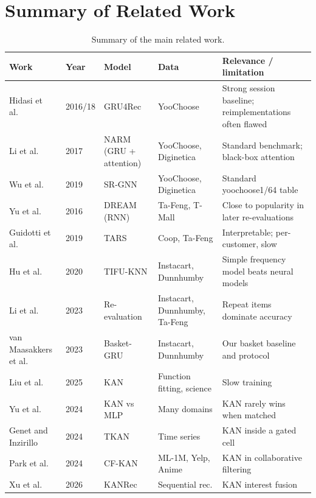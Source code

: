 \documentclass[12pt,a4paper]{report}
\begin{document}
\section{Summary of Related Work}


\begin{table}[H]
\centering
\caption{Summary of the main related work.}
\label{tab:related}
\small
\begin{tabular}{L{3.2cm} L{1.3cm} L{2.7cm} L{2.5cm} L{3.9cm}}
\toprule
\textbf{Work} & \textbf{Year} & \textbf{Model} & \textbf{Data} & \textbf{Relevance / limitation} \\
\midrule
Hidasi et al.\ \cite{hidasi2016,hidasi2018} & 2016/18 & GRU4Rec & YooChoose & Strong session baseline; reimplementations often flawed \cite{hidasi2023} \\
Li et al.\ \cite{li2017} & 2017 & NARM (GRU + attention) & YooChoose, Diginetica & Standard benchmark; black-box attention \\
Wu et al.\ \cite{wu2019} & 2019 & SR-GNN & YooChoose, Diginetica & Standard yoochoose1/64 table \\
Yu et al.\ \cite{yu2016} & 2016 & DREAM (RNN) & Ta-Feng, T-Mall & Close to popularity in later re-evaluations \cite{li2023} \\
Guidotti et al.\ \cite{guidotti2019} & 2019 & TARS & Coop, Ta-Feng & Interpretable; per-customer, slow \\
Hu et al.\ \cite{hu2020} & 2020 & TIFU-KNN & Instacart, Dunnhumby & Simple frequency model beats neural models \\
Li et al.\ \cite{li2023} & 2023 & Re-evaluation & Instacart, Dunnhumby, Ta-Feng & Repeat items dominate accuracy \\
van Maasakkers et al.\ \cite{vanmaasakkers2023} & 2023 & Basket-GRU & Instacart, Dunnhumby & Our basket baseline and protocol \\
Liu et al.\ \cite{liu2025kan} & 2025 & KAN & Function fitting, science & Slow training \\
Yu et al.\ \cite{yu2024} & 2024 & KAN vs MLP & Many domains & KAN rarely wins when matched \\
Genet and Inzirillo \cite{genet2024} & 2024 & TKAN & Time series & KAN inside a gated cell \\
Park et al.\ \cite{park2024cfkan} & 2024 & CF-KAN & ML-1M, Yelp, Anime & KAN in collaborative filtering \\
Xu et al.\ \cite{xu2026kanrec} & 2026 & KANRec & Sequential rec. & KAN interest fusion \\
\bottomrule
\end{tabular}
\end{table}
\end{document}
